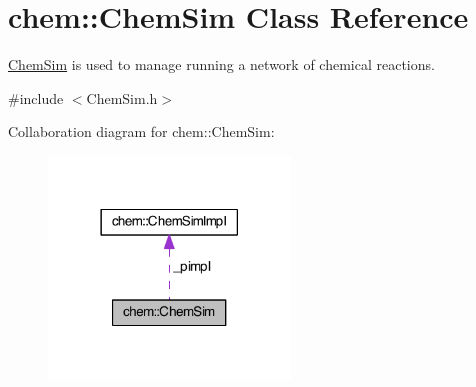 \hypertarget{classchem_1_1ChemSim}{\section{chem\-:\-:Chem\-Sim Class Reference}
\label{classchem_1_1ChemSim}
}


\hyperlink{classchem_1_1ChemSim}{Chem\-Sim} is used to manage running a network of chemical reactions.  




{\ttfamily \#include $<$Chem\-Sim.\-h$>$}



Collaboration diagram for chem\-:\-:Chem\-Sim\-:\nopagebreak
\begin{figure}[H]
\begin{center}
\leavevmode
\includegraphics[width=182pt]{classchem_1_1ChemSim__coll__graph}
\end{center}
\end{figure}

